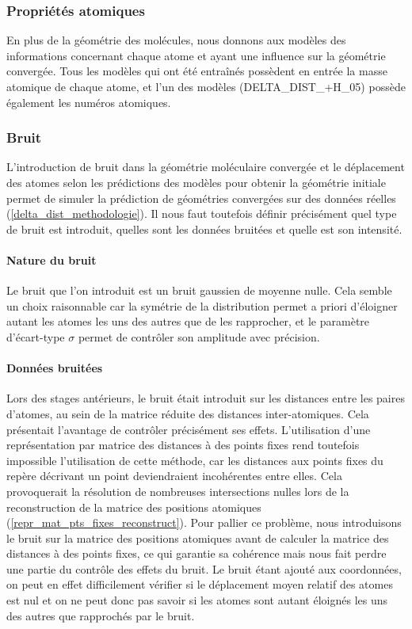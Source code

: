 \subsubsection{Propriétés atomiques}
\par En plus de la géométrie des molécules, nous donnons aux modèles des informations concernant chaque atome et ayant une influence sur la géométrie convergée. Tous les modèles qui ont été entraînés possèdent en entrée la masse atomique de chaque atome, et l'un des modèles (DELTA\_DIST\_+H\_05) possède également les numéros atomiques.

\subsubsection{Bruit}
\label{delta_dist_prep_bruit}

\par L'introduction de bruit dans la géométrie moléculaire convergée et le déplacement des atomes selon les prédictions des modèles pour obtenir la géométrie initiale permet de simuler la prédiction de géométries convergées sur des données réelles (\ref{delta_dist_methodologie}). Il nous faut toutefois définir précisément quel type de bruit est introduit, quelles sont les données bruitées et quelle est son intensité.\\

\paragraph{Nature du bruit} Le bruit que l'on introduit est un bruit gaussien de moyenne nulle. Cela semble un choix raisonnable car la symétrie de la distribution permet a priori d'éloigner autant les atomes les uns des autres que de les rapprocher, et le paramètre d'écart-type $\sigma$ permet de contrôler son amplitude avec précision.\\

\paragraph{Données bruitées} Lors des stages antérieurs, le bruit était introduit sur les distances entre les paires d'atomes, au sein de la matrice réduite des distances inter-atomiques. Cela présentait l'avantage de contrôler précisément ses effets. L'utilisation d'une représentation par matrice des distances à des points fixes rend toutefois impossible l'utilisation de cette méthode, car les distances aux points fixes du repère décrivant un point deviendraient incohérentes entre elles. Cela provoquerait la résolution de nombreuses intersections nulles lors de la reconstruction de la matrice des positions atomiques (\ref{repr_mat_pts_fixes_reconstruct}). Pour pallier ce problème, nous introduisons le bruit sur la matrice des positions atomiques avant de calculer la matrice des distances à des points fixes, ce qui garantie sa cohérence mais nous fait perdre une partie du contrôle des effets du bruit. Le bruit étant ajouté aux coordonnées, on peut en effet difficilement vérifier si le déplacement moyen relatif des atomes est nul et on ne peut donc pas savoir si les atomes sont autant éloignés les uns des autres que rapprochés par le bruit.\\


